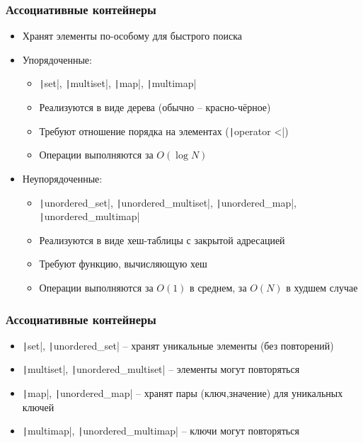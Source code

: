 \documentclass[10pt]{beamer}
\begin{document}
\begin{frame}[fragile]
\frametitle{Ассоциативные контейнеры}
\begin{itemize}
\item Хранят элементы по-особому для быстрого поиска
\pause
\item Упорядоченные:
\begin{itemize}
\item \texttt|set|, \texttt|multiset|, \texttt|map|, \texttt|multimap|
\pause
\item Реализуются в виде дерева (обычно -- красно-чёрное)
\pause
\item Требуют отношение порядка на элементах (\texttt|operator <|)
\pause
\item Операции выполняются за \(O(\log N)\)
\end{itemize}
\pause
\item Неупорядоченные:
\begin{itemize}
\item \texttt|unordered_set|, \texttt|unordered_multiset|, \texttt|unordered_map|, \texttt|unordered_multimap|
\pause
\item Реализуются в виде хеш-таблицы с закрытой адресацией
\pause
\item Требуют функцию, вычисляющую хеш
\pause
\item Операции выполняются за \(O(1)\) в среднем, за \(O(N)\) в худшем случае
\end{itemize}
\end{itemize}
\end{frame}

\begin{frame}[fragile]
\frametitle{Ассоциативные контейнеры}
\begin{itemize}
\item \texttt|set|, \texttt|unordered_set| -- хранят уникальные элементы (без повторений)
\pause
\item \texttt|multiset|, \texttt|unordered_multiset| -- элементы могут повторяться
\pause
\item \texttt|map|, \texttt|unordered_map| -- хранят пары (ключ,значение) для уникальных ключей
\pause
\item \texttt|multimap|, \texttt|unordered_multimap| -- ключи могут повторяться
\end{itemize}
\end{frame}
\end{document}
